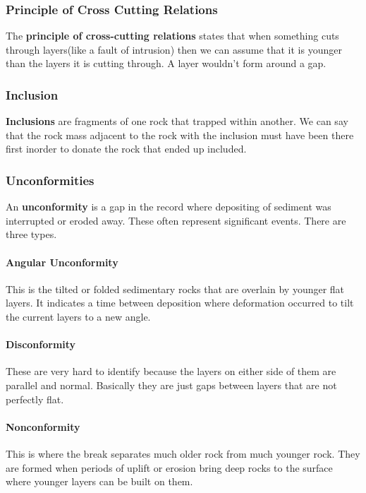 \documentclass{article}
\begin{document}
\subsubsection{Principle of Cross Cutting Relations} %
\label{sub:principle_of_cross_cutting_relations}
The \textbf{principle of cross-cutting relations} states that when something cuts through layers(like a fault of intrusion) then we can assume that it is younger than the layers it is cutting through. A layer wouldn't form around a gap.

\subsubsection{Inclusion} %
\label{sub:inclusion}
\textbf{Inclusions} are fragments of one rock that trapped within another. We can say that the rock mass adjacent to the rock with the inclusion must have been there first inorder to donate the rock that ended up included.

\subsubsection{Unconformities} %
\label{sub:unconformities}
An \textbf{unconformity} is a gap in the record where depositing of sediment was interrupted or eroded away. These often represent significant events. There are three types.

\paragraph{Angular Unconformity} %
\label{par:angular_unconformity}
This is the tilted or folded sedimentary rocks that are overlain by younger flat layers. It indicates a time between deposition where deformation occurred to tilt the current layers to a new angle.

\paragraph{Disconformity} %
\label{par:disconformity}
These are very hard to identify because the layers on either side of them are parallel and normal. Basically they are just gaps between layers that are not perfectly flat.

\paragraph{Nonconformity} %
\label{par:nonconformity}
This is where the break separates much older rock from much younger rock. They are formed when periods of uplift or erosion bring deep rocks to the surface where younger layers can be built on them.
\end{document}
